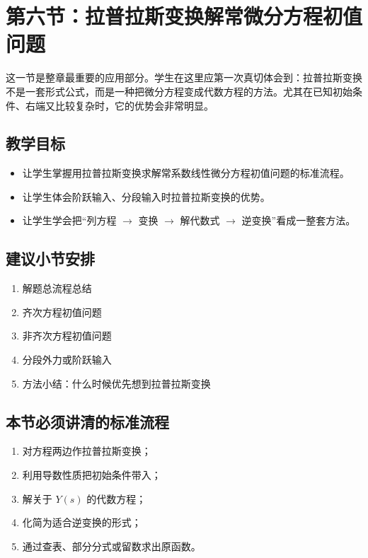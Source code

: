 \section{第六节：拉普拉斯变换解常微分方程初值问题}

\begin{wulibj}[本节要解决的问题]
这一节是整章最重要的应用部分。学生在这里应第一次真切体会到：拉普拉斯变换不是一套形式公式，而是一种把微分方程变成代数方程的方法。尤其在已知初始条件、右端又比较复杂时，它的优势会非常明显。
\end{wulibj}

\subsection*{教学目标}
\begin{itemize}
    \item 让学生掌握用拉普拉斯变换求解常系数线性微分方程初值问题的标准流程。
    \item 让学生体会阶跃输入、分段输入时拉普拉斯变换的优势。
    \item 让学生学会把``列方程 $\to$ 变换 $\to$ 解代数式 $\to$ 逆变换''看成一整套方法。
\end{itemize}

\subsection*{建议小节安排}
\begin{enumerate}
    \item 解题总流程总结
    \item 齐次方程初值问题
    \item 非齐次方程初值问题
    \item 分段外力或阶跃输入
    \item 方法小结：什么时候优先想到拉普拉斯变换
\end{enumerate}

\subsection*{本节必须讲清的标准流程}
\begin{enumerate}
    \item 对方程两边作拉普拉斯变换；
    \item 利用导数性质把初始条件带入；
    \item 解关于 $Y(s)$ 的代数方程；
    \item 化简为适合逆变换的形式；
    \item 通过查表、部分分式或留数求出原函数。
\end{enumerate}

